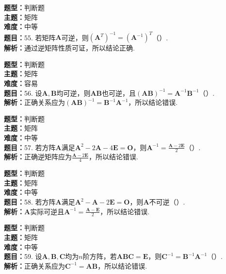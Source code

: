 \documentclass{ctexart}
\newenvironment{question}[5]{%
	\noindent\textbf{题型：}#1\\
	\textbf{主题：}#2\\
	\textbf{难度：}#3\\
	\textbf{题目：}#4\\
	\textbf{解析：}#5\\
	\vspace{1em}
}{}
\begin{document}
	\begin{question}
		{判断题}
		{矩阵}
		{中等}
		{55. 若矩阵\(\mathbf{A}\)可逆，则\((\mathbf{A}^T)^{-1}=(\mathbf{A}^{-1})^T\)（）.}
		{通过逆矩阵性质可证，所以结论正确.}
	\end{question}
	
	\begin{question}
		{判断题}
		{矩阵}
		{容易}
		{56. 设\(\mathbf{A},\mathbf{B}\)均可逆，则\(\mathbf{AB}\)也可逆，且\((\mathbf{AB})^{-1}=\mathbf{A}^{-1}\mathbf{B}^{-1}\)（）.}
		{正确关系应为\((\mathbf{AB})^{-1}=\mathbf{B}^{-1}\mathbf{A}^{-1}\)，所以结论错误.}
	\end{question}
	
	\begin{question}
		{判断题}
		{矩阵}
		{中等}
		{57. 若方阵\(\mathbf{A}\)满足\(\mathbf{A}^2-2\mathbf{A}-4\mathbf{E}=\mathbf{O}\)，则\(\mathbf{A}^{-1}=\frac{\mathbf{A}-2\mathbf{E}}{2}\)（）.}
		{正确逆矩阵应为\(\frac{\mathbf{A}-2\mathbf{E}}{4}\)，所以结论错误.}
	\end{question}
	
	\begin{question}
		{判断题}
		{矩阵}
		{中等}
		{58. 若方阵\(\mathbf{A}\)满足\(\mathbf{A}^2-\mathbf{A}-2\mathbf{E}=\mathbf{O}\)，则\(\mathbf{A}\)不可逆（）.}
		{\(\mathbf{A}\)实际可逆且\(\mathbf{A}^{-1}=\frac{\mathbf{A}-\mathbf{E}}{2}\)，所以结论错误.}
	\end{question}
	
	\begin{question}
		{判断题}
		{矩阵}
		{中等}
		{59. 设\(\mathbf{A},\mathbf{B},\mathbf{C}\)均为\(n\)阶方阵，若\(\mathbf{ABC}=\mathbf{E}\)，则\(\mathbf{C}^{-1}=\mathbf{B}^{-1}\mathbf{A}^{-1}\)（）.}
		{正确关系应为\(\mathbf{C}^{-1}=\mathbf{AB}\)，所以结论错误.}
	\end{question}
	
	
	
	
\end{document}
